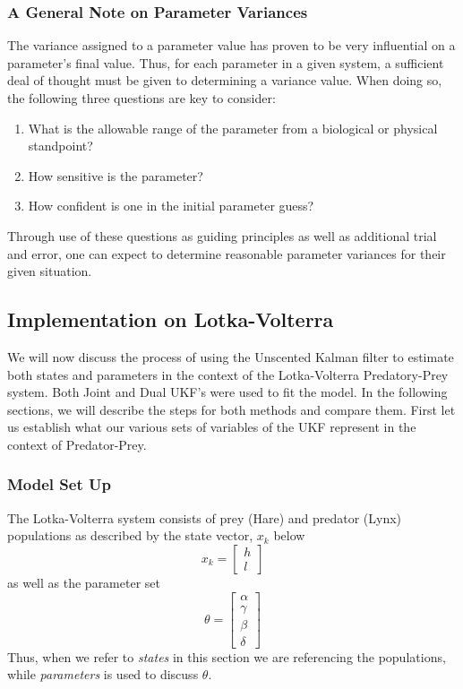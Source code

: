\subsubsection{A General Note on Parameter Variances}
The variance assigned to a parameter value has proven to be very influential on a parameter's final value. Thus, for each parameter in a given system, a sufficient deal of thought must be given to determining a variance value. When doing so, the following three questions are key to consider:
\begin{enumerate}
    \item What is the allowable range of the parameter from a biological or physical standpoint?
    \item How sensitive is the parameter?
    \item How confident is one in the initial parameter guess?
\end{enumerate}
Through use of these questions as guiding principles as well as additional trial and error, one can expect to determine reasonable parameter variances for their given situation.


\subsection{Implementation on Lotka-Volterra}
We will now discuss the process of using the Unscented Kalman filter to estimate both states and parameters in the context of the Lotka-Volterra Predatory-Prey system. Both Joint and Dual UKF's were used to fit the model. In the following sections, we will describe the steps for both methods and compare them. First let us establish what our various sets of variables of the UKF represent in the context of Predator-Prey.

\subsubsection{Model Set Up}
The Lotka-Volterra system consists of prey (Hare) and predator (Lynx) populations as described by the state vector, $x_k$ below \\
\begin{equation}
x_k =
\begin{bmatrix}
h\\
l
\end{bmatrix}
\end{equation}
as well as the parameter set
\begin{equation}
\theta = 
\begin{bmatrix}
\alpha\\
\gamma\\
\beta\\
\delta
\end{bmatrix}
\end{equation}
Thus, when we refer to \emph{states} in this section we are referencing the populations, while \emph{parameters} is used to discuss $\theta$. \\

